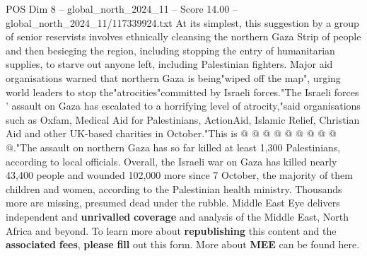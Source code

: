 \begin{textsample}{POS Dim 8 – global\_north\_2024\_11 – Score 14.00 – global\_north\_2024\_11/117339924.txt}
At its simplest, this suggestion by a group of senior reservists involves ethnically cleansing the northern Gaza Strip of people and then besieging the region, including stopping the entry of humanitarian supplies, to starve out anyone left, including Palestinian fighters.
Major aid organisations warned that northern Gaza is being"wiped off the map", urging world leaders to stop the"atrocities"committed by Israeli forces."The Israeli forces ' assault on Gaza has escalated to a horrifying level of atrocity,"said organisations such as Oxfam, Medical Aid for Palestinians, ActionAid, Islamic Relief, Christian Aid and other UK-based charities in October."This is @ @ @ @ @ @ @ @ @ @."The assault on northern Gaza has so far killed at least 1,300 Palestinians, according to local officials.
Overall, the Israeli war on Gaza has killed nearly 43,400 people and wounded 102,000 more since 7 October, the majority of them children and women, according to the Palestinian health ministry.
Thousands more are missing, presumed dead under the rubble.
Middle East Eye delivers independent and \textbf{unrivalled} \textbf{coverage} and analysis of the Middle East, North Africa and beyond.
To learn more about \textbf{republishing} this content and the \textbf{associated} \textbf{fees}, \textbf{please} \textbf{fill} out this form.
More about \textbf{MEE} can be found here.

\end{textsample}
